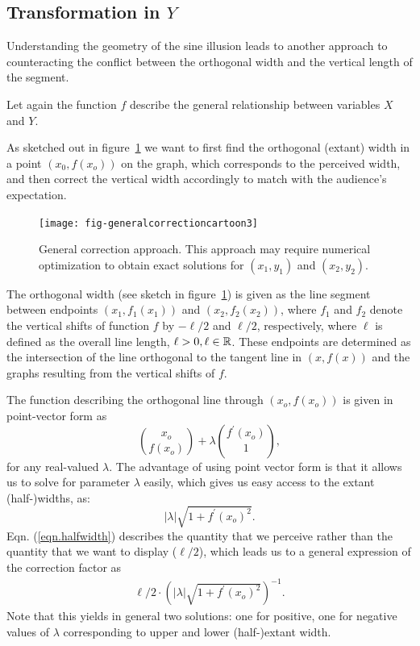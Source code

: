 \documentclass[11pt]{isuthesis}\usepackage[]{graphicx}\usepackage[]{color}
\begin{document}
\subsection{Transformation in $Y$}
Understanding the geometry of the sine illusion leads to another approach to counteracting  the conflict between the orthogonal width and the vertical length of the segment. 


Let again the function $f$ describe the general relationship between variables $X$ and $Y$. 


As sketched out in figure~\ref{fig:GeneralCorrection} we want to first find the orthogonal (extant) width in a point $(x_0, f(x_o))$ on the graph, which corresponds to the  perceived width, and then correct the vertical width accordingly to match with the audience's expectation.

\begin{figure}
\centering
\texttt{[image: fig-generalcorrectioncartoon3]}
\caption[General correction approach]{ General correction approach. This approach may require numerical optimization to obtain exact solutions for $(x_1, y_1)$ and $(x_2, y_2)$.}\label{fig:GeneralCorrection}
\end{figure}

The orthogonal width (see sketch in figure~\ref{fig:GeneralCorrection}) is given as the line segment between endpoints $(x_1, f_1(x_1))$ and $(x_2, f_2(x_2))$, where $f_1$ and $f_2$ denote the vertical shifts of function $f$ by $-\ell/2$ and $\ell/2$, respectively, where $\ell$ is defined as the overall line length, $\ell > 0, \ell \in \mathbb{R}$.
These endpoints are determined as the intersection of the line  orthogonal to the tangent line in $(x, f(x))$ and the graphs resulting from the vertical shifts of $f$.

The function describing the orthogonal line through $(x_o, f(x_o))$ is given in point-vector form as 
\[
{x_o \choose f(x_o)} + \lambda {f^\prime(x_o) \choose 1}, 
\]
for any real-valued $\lambda$.
The advantage of using point vector form is that it allows us to solve for parameter $\lambda$ easily, which gives us easy access to the extant (half-)widths,  as: 
\begin{equation}\label{eqn.halfwidth}
|\lambda| \sqrt{1 + f^\prime(x_o)^2}.
\end{equation}
Eqn. (\ref{eqn.halfwidth}) describes the quantity that we perceive rather than the quantity that we want to display ($\ell/2$), which leads us to a general expression of the correction factor as
\begin{eqnarray*}
 \ell/2 \cdot \left(|\lambda| \sqrt{1 + f^\prime(x_o)^2}\right)^{-1}.
\end{eqnarray*}
Note that this yields in general two solutions: one for positive, one for negative values of $\lambda$ corresponding to upper and lower (half-)extant width.
\end{document}
